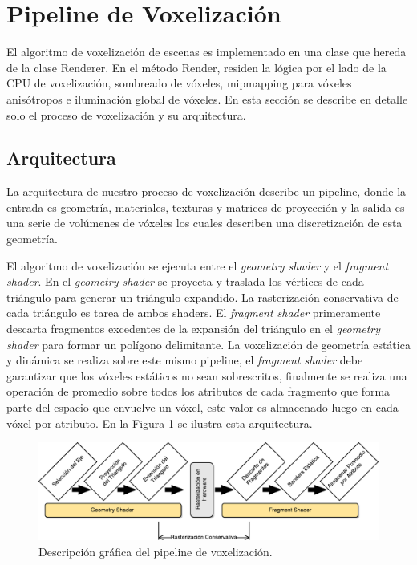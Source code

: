 \section{Pipeline de Voxelización} %
\label{sec:pipeline_de_voxelizacion}
El algoritmo de voxelización de escenas es implementado en una clase que hereda de la clase Renderer. En el método Render, residen la lógica por el lado de la CPU de voxelización, sombreado de vóxeles, mipmapping para vóxeles anisótropos e iluminación global de vóxeles. En esta sección se describe en detalle solo el proceso de voxelización y su arquitectura.
\subsection{Arquitectura}

La arquitectura de nuestro proceso de voxelización describe un pipeline, donde la entrada es geometría, materiales, texturas y matrices de proyección y la salida es una serie de volúmenes de vóxeles los cuales describen una discretización de esta geometría.

El algoritmo de voxelización se ejecuta entre el \emph{geometry shader} y el \emph{fragment shader}. En el \emph{geometry shader} se proyecta y traslada los vértices de cada triángulo para generar un triángulo expandido. La rasterización conservativa de cada triángulo es tarea de ambos shaders. El \emph{fragment shader} primeramente descarta fragmentos excedentes de la expansión del triángulo en el \emph{geometry shader} para formar un polígono delimitante. La voxelización de geometría estática y dinámica se realiza sobre este mismo pipeline, el \emph{fragment shader} debe garantizar que los vóxeles estáticos no sean sobrescritos, finalmente se realiza una operación de promedio sobre todos los atributos de cada fragmento que forma parte del espacio que envuelve un vóxel, este valor es almacenado luego en cada vóxel por atributo. En la Figura \ref{fig:voxel_pipeline_impl} se ilustra esta arquitectura.
\begin{figure}[H]
    \centering
    \includegraphics[width=\linewidth]{media/voxel_pipeline_cropped.pdf}
    \caption{Descripción gráfica del pipeline de voxelización.}
    \label{fig:voxel_pipeline_impl}
\end{figure}


